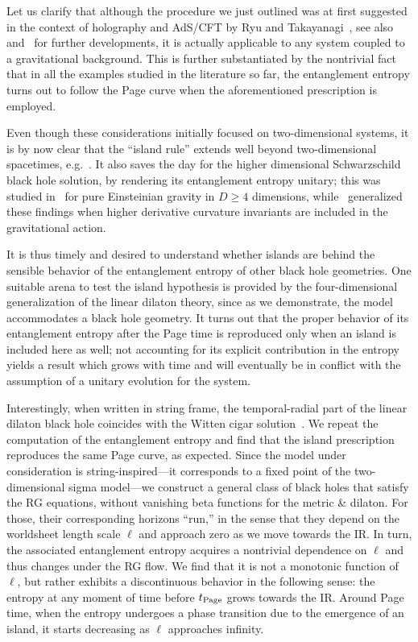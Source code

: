 \documentclass[a4paper, 12pt]{article}
\begin{document}
Let us clarify that although the procedure we just outlined was at first suggested in the context of holography and AdS/CFT by Ryu and Takayanagi~\cite{Ryu:2006bv}, see also~\cite{Hubeny:2007xt,Lewkowycz:2013nqa,Barrella:2013wja,Faulkner:2013ana,Engelhardt:2014gca} and~\cite{Penington:2019npb,Almheiri:2019psf,Almheiri:2019hni} for further developments, it is actually applicable to any system coupled to a gravitational background. This is further substantiated by the nontrivial fact that in all the examples studied in the literature so far, the entanglement entropy turns out to follow the Page curve when the aforementioned prescription is employed. 

Even though  these considerations  initially focused on two-dimensional systems, it is by now clear that the ``island rule'' extends well beyond two-dimensional spacetimes, e.g.~\cite{Almheiri:2019psy,Hashimoto:2020cas,Alishahiha:2020qza,Geng:2020qvw}. It also saves the day for the higher dimensional Schwarzschild black hole solution, by rendering its entanglement entropy unitary; this was studied in~\cite{Hashimoto:2020cas} for pure Einsteinian gravity in $D\ge 4$ dimensions, while~\cite{Alishahiha:2020qza} generalized these findings when higher derivative curvature invariants are included in the gravitational action. 

It is thus timely and desired to understand whether islands are behind the sensible behavior of the entanglement entropy of other black hole geometries. 
One suitable arena to test  the island hypothesis is provided by the four-dimensional generalization of the linear dilaton theory, since as we demonstrate, the model accommodates a black hole geometry. It turns out that the proper behavior
of its entanglement entropy after the Page time is reproduced only when an island is included here as well; not accounting for its explicit contribution in the entropy 
yields a result which grows with time and will eventually be in conflict with the assumption of a unitary evolution for the system.

Interestingly, when written in  string frame, the temporal-radial part of the linear dilaton black hole coincides with the Witten cigar solution~\cite{Witten:1991yr}. We repeat the computation of the entanglement entropy and find that the island prescription reproduces the same Page curve, as expected. 
Since the model under consideration is string-inspired---it corresponds to a fixed point of the two-dimensional sigma model---we construct a general class of black holes that satisfy the RG equations, without vanishing beta functions for the metric \& dilaton. For those, their corresponding horizons ``run,'' in the sense that they depend on the worldsheet length scale $\ell$ and approach zero as we move towards the IR. In turn, the associated entanglement entropy acquires a nontrivial dependence on $\ell$ and thus changes under the RG flow. We find that it is not a monotonic function of $\ell$, but rather exhibits a discontinuous behavior in the following sense: the entropy at any moment of time  before $t_{\rm Page}$ grows towards the IR. Around Page time, when the entropy undergoes a phase transition due to the emergence of an island, it starts decreasing as $\ell$ approaches infinity. 
\end{document}
